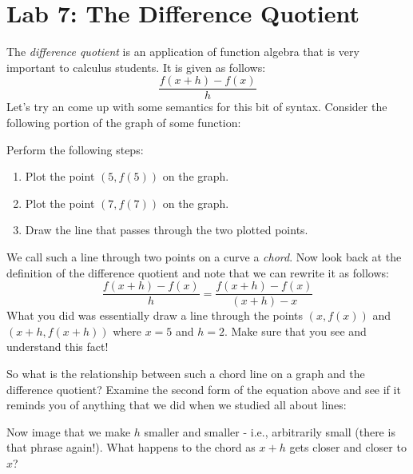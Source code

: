 \documentclass[letterpaper,12pt,fleqn]{article}
\begin{document}
\section*{Lab 7: The Difference Quotient}

The \emph{difference quotient} is an application of function algebra that is
very important to calculus students. It is given as follows:
\[\frac{f(x+h)-f(x)}{h}\]
Let's try an come up with some semantics for this bit of syntax. Consider the following
portion of the graph of some function:

\begin{minipage}{\textwidth}
  \centering
\end{minipage}

Perform the following steps:
\begin{enumerate}
\item Plot the point $(5,f(5))$ on the graph.
\item Plot the point $(7,f(7))$ on the graph.
\item Draw the line that passes through the two plotted points.
\end{enumerate}

We call such a line through two points on a curve a \emph{chord}. Now look back at the
definition of the difference quotient and note that we can rewrite it as follows:
\[\frac{f(x+h)-f(x)}{h}=\frac{f(x+h)-f(x)}{(x+h)-x}\]
What you did was essentially draw a line through the points $(x,f(x))$ and $(x+h,f(x+h))$
where $x=5$ and $h=2$. Make sure that you see and understand this fact!

So what is the relationship between such a chord line on a graph and the difference
quotient? Examine the second form of the equation above and see if it reminds you of
anything that we did when we studied all about lines:

\vspace{1in}

Now image that we make $h$ smaller and smaller - i.e., arbitrarily small (there is that
phrase again!). What happens to the chord as $x+h$ gets closer and closer to $x$?
\end{document}
